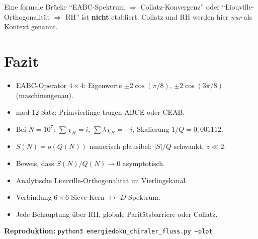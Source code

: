 \documentclass[12pt,a4paper]{article}
\begin{document}
\begin{tcolorbox}[offen,title={Getrennt zu halten}]
Eine formale Brücke ``EABC-Spektrum $\Rightarrow$ Collatz-Konvergenz''
oder ``Liouville-Orthogonalität $\Rightarrow$ RH'' ist \textbf{nicht}
etabliert. Collatz und RH werden hier \emph{nur} als Kontext genannt.
\end{tcolorbox}

\section{Fazit}
\label{sec:fazit}

\begin{tcolorbox}[bewiesen,title={Verifiziert / architektonischer Schlussstein}]
\begin{itemize}[nosep]
  \item EABC-Operator $4\times 4$: Eigenwerte
        $\pm 2\cos(\pi/8)$, $\pm 2\cos(3\pi/8)$ (maschinengenau).
  \item mod-$12$-Satz: Primvierlinge tragen ABCE oder CEAB.
  \item Bei $N=10^7$: $\sum\chi_H=i$, $\sum\lambda\chi_H=-i$,
        Skalierung $1/Q=0{,}001112$.
  \item $S(N)=o(Q(N))$ numerisch plausibel; $|S|/Q$ schwankt,
        $z\ll 2$.
\end{itemize}
\end{tcolorbox}

\begin{tcolorbox}[offen,title={Offene analytische Brücke}]
\begin{itemize}[nosep]
  \item Beweis, dass $S(N)/Q(N)\to 0$ asymptotisch.
  \item Analytische Liouville-Orthogonalität im Vierlingskanal.
  \item Verbindung $6\times 6$-Sieve-Kern $\leftrightarrow$ $D$-Spektrum.
  \item Jede Behauptung über RH, globale Paritätsbarriere oder Collatz.
\end{itemize}
\end{tcolorbox}

\medskip
\noindent
\textbf{Reproduktion:}
\texttt{python3 energiedoku\_chiraler\_fluss.py --plot}
\end{document}
